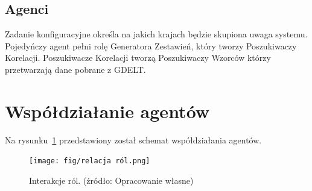 \documentclass[11pt]{report}
\begin{document}
    \subsection{Agenci}
    Zadanie konfiguracyjne określa na jakich krajach będzie skupiona uwaga systemu.
    Pojedyńczy agent pełni rolę Generatora Zestawień, który tworzy Poszukiwaczy Korelacji.
    Poszukiwacze Korelacji tworzą Poszukiwaczy Wzorców którzy przetwarzają dane pobrane z GDELT\@.


    \section{Współdziałanie agentów}
    Na rysunku~\ref{fig:relacje} przedstawiony został schemat współdziałania agentów.
    \begin{figure}[!ht]
        \centering
        \texttt{[image: fig/relacja ról.png]}
        \caption{Interakcje ról. (źródło: Opracowanie własne)}
        \label{fig:relacje}
    \end{figure}


%
%
%
%
\end{document}
